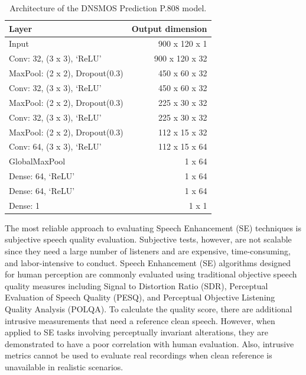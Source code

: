 \begin{table}[ht]
    \centering
    \begin{tabular}{|l|r|}
        \hline
        \textbf{Layer}                 & \textbf{Output dimension} \\
        \hline
        Input                          & 900 x 120 x 1             \\
        \hline
        Conv: 32, (3 x 3), ‘ReLU’      & 900 x 120 x 32            \\
        MaxPool: (2 x 2), Dropout(0.3) & 450 x 60 x 32             \\
        \hline
        Conv: 32, (3 x 3), ‘ReLU’      & 450 x 60 x 32             \\
        MaxPool: (2 x 2), Dropout(0.3) & 225 x 30 x 32             \\
        \hline
        Conv: 32, (3 x 3), ‘ReLU’      & 225 x 30 x 32             \\
        MaxPool: (2 x 2), Dropout(0.3) & 112 x 15 x 32             \\
        \hline
        Conv: 64, (3 x 3), ‘ReLU’      & 112 x 15 x 64             \\
        GlobalMaxPool                  & 1 x 64                    \\
        \hline
        Dense: 64, ‘ReLU’              & 1 x 64                    \\
        Dense: 64, ‘ReLU’              & 1 x 64                    \\
        Dense: 1                       & 1 x 1                     \\
        \hline
    \end{tabular}
    \caption{Architecture of the DNSMOS Prediction P.808 model.}
    \label{tab:dnnmos-808-architecture}
\end{table}

The most reliable approach to evaluating Speech Enhancement (SE) techniques is subjective speech quality evaluation. Subjective tests, however, are not scalable since they need a large number of listeners and are expensive, time-consuming, and labor-intensive to conduct. Speech Enhancement (SE) algorithms designed for human perception are commonly evaluated using traditional objective speech quality measures including Signal to Distortion Ratio (SDR), Perceptual Evaluation of Speech Quality (PESQ), and Perceptual Objective Listening Quality Analysis (POLQA). To calculate the quality score, there are additional intrusive measurements that need a reference clean speech. However, when applied to SE tasks involving perceptually invariant alterations, they are demonstrated to have a poor correlation with human evaluation. Also, intrusive metrics cannot be used to evaluate real recordings when clean reference is unavailable in realistic scenarios.

